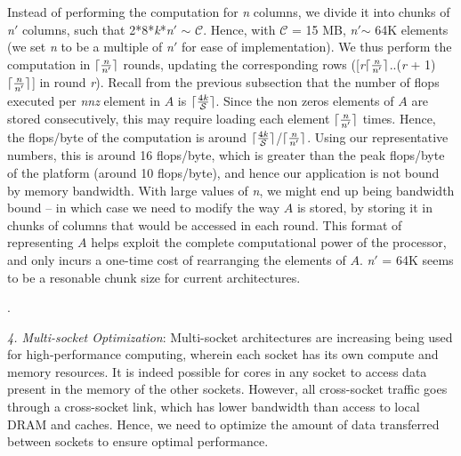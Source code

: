      Instead of performing the computation for {\it{n}} columns, we
     divide it into chunks of {\it{n}}$'$ columns, such that
     2*8*{\it{k}}*{\it{n}}$'$ $\sim$ $\mathcal{C}$. Hence, with
     $\mathcal{C}$ = 15 MB,  {\it{n}}$'$$\sim$ 64K elements (we set
     {\it{n}} to be a multiple of {\it{n}}$'$ for ease of
     implementation). We thus perform the computation in
     $\lceil\frac{\it{n}}{\it{n}'}\rceil$ rounds, 
     updating the corresponding rows
     ([{\it{r}}$\lceil\frac{\it{n}}{\it{n}'}\rceil$..({\it{r}} +
     1)$\lceil\frac{\it{n}}{\it{n}'}\rceil$]
     in round {\it{r}}).
     Recall from the previous subsection that the number of flops
     executed per {\it{nnz}} element in $A$ is
     $\lceil\frac{4{\it{k}}}{\mathcal{S}}\rceil$.
     Since the non zeros elements of $A$ are stored consecutively, 
     this may require loading each element
     $\lceil\frac{\it{n}}{\it{n}'}\rceil$ times. Hence, the flops/byte
     of the computation is around
     $\lceil\frac{4{\it{k}}}{\mathcal{S}}\rceil$/$\lceil\frac{\it{n}}{\it{n}'}\rceil$.
     Using our representative numbers, this is around 16 flops/byte,
     which is greater than the peak flops/byte of the platform (around
     10 flops/byte), and
     hence our application is not bound by memory bandwidth. With
     large values of {\it{n}}, we might end up being bandwidth bound
     -- in which case we need to modify the way $A$ is stored, by
     storing it in chunks of columns that would be accessed in each
     round. This format of representing $A$  helps 
     exploit the complete computational power of the processor, 
     and only incurs a
     one-time cost of rearranging  the elements of $A$.
     {\it{n}}$'$ = 64K seems to be a resonable chunk size for current
     architectures.

     .
     

     \vspace*{0.1in}
     {\it{4. Multi-socket Optimization}}: 
     Multi-socket architectures are increasing being used for
     high-performance computing, wherein each socket has its own
     compute and memory resources. It is indeed possible for cores in
     any socket to access data present in the memory of the other
     sockets. However, all cross-socket traffic goes through a
     cross-socket link, which has lower bandwidth than access to local
     DRAM and caches. Hence, we need to optimize the amount of data
     transferred between sockets to ensure optimal performance.

